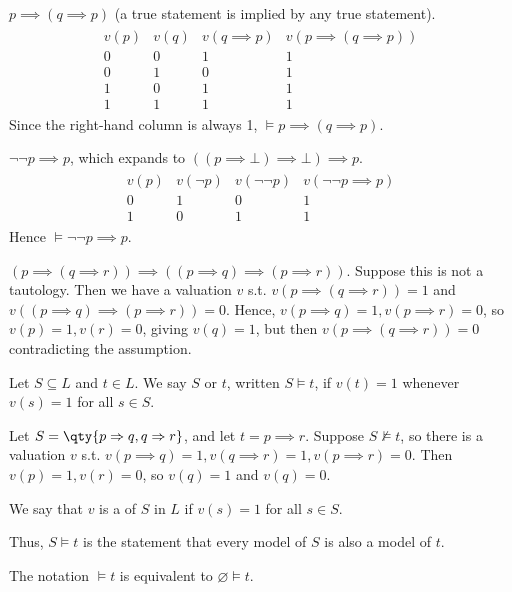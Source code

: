 \begin{example}
    $p \implies (q \implies p)$ (a true statement is implied by any true statement).
    \begin{align*}
\begin{array}{cccc}
        v(p) & v(q) & v(q \implies p) & v(p \implies (q \implies p)) \\
        0 & 0 & 1 & 1 \\
        0 & 1 & 0 & 1 \\
        1 & 0 & 1 & 1 \\
        1 & 1 & 1 & 1
    \end{array}
\end{align*}
    Since the right-hand column is always 1, $\models p \implies (q \implies p)$.
\end{example}

\begin{example}
    $\neg \neg p \implies p$, which expands to $((p \implies \bot) \implies \bot) \implies p$.
    \begin{align*}
\begin{array}{cccc}
        v(p) & v(\neg p) & v(\neg \neg p) & v(\neg \neg p \implies p) \\
        0 & 1 & 0 & 1 \\
        1 & 0 & 1 & 1
    \end{array}
\end{align*}
    Hence $\models \neg \neg p \implies p$.
\end{example}
\begin{example}
    $(p \implies (q \implies r)) \implies ((p \implies q) \implies (p \implies r))$.
    Suppose this is not a tautology.
    Then we have a valuation $v$ s.t. $v(p \implies (q \implies r)) = 1$ and $v((p \implies q) \implies (p \implies r)) = 0$.
    Hence, $v(p \implies q) = 1, v(p \implies r) = 0$, so $v(p) = 1, v(r) = 0$, giving $v(q) = 1$, but then $v(p \implies (q \implies r)) = 0$ contradicting the assumption.
\end{example}
\begin{definition}
    Let $S \subseteq L$ and $t \in L$.
    We say $S$  or  $t$, written $S \models t$, if $v(t) = 1$ whenever $v(s) = 1$ for all $s \in S$.
\end{definition}
\begin{example}
    Let $S = \qty{p \implies q, q \implies r}$, and let $t = p \implies r$.
    Suppose $S \not\models t$, so there is a valuation $v$ s.t. $v(p \implies q) = 1, v(q \implies r) = 1, v(p \implies r) = 0$.
    Then $v(p) = 1, v(r) = 0$, so $v(q) = 1$ and $v(q) = 0$.
\end{example}
\begin{definition}
    We say that $v$ is a  of $S$ in $L$ if $v(s) = 1$ for all $s \in S$.
\end{definition}
Thus, $S \models t$ is the statement that every model of $S$ is also a model of $t$.
\begin{remark}
    The notation $\models t$ is equivalent to $\varnothing \models t$.
\end{remark}

